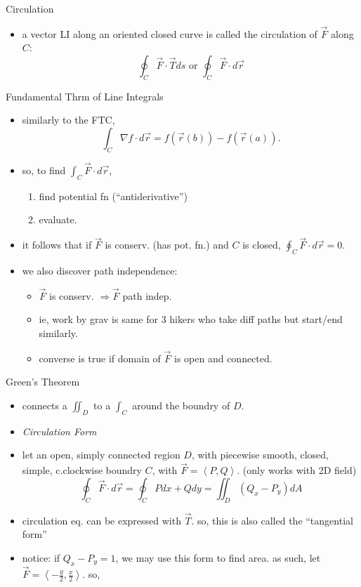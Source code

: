 \documentclass[11pt]{article}
\theoremstyle{definition}
\newcommand{\col}[1]{\begin{minipage}{\columnwidth}#1\end{minipage}}
\begin{document}
\newpage
\begin{multicols}{2}
  \col{
    Circulation
    \begin{itemize}
      \item a vector LI along an oriented closed curve is called the circulation of $\vec{F}$ along $C$:
      \[\oint_C \vec{F}\cdot\vec{T} ds \text{ or } \oint_C \vec{F}\cdot d\vec{r}\]
    \end{itemize}
    Fundamental Thrm of Line Integrals
    \begin{itemize}
      \item similarly to the FTC,
      \[\int_C \nabla f \cdot d\vec{r} = f(\vec{r}(b))-f(\vec{r}(a)).\]
      \item so, to find $\int_C \vec{F}\cdot d\vec{r}$,
      \begin{enumerate}
        \item find potential fn (``antiderivative'')
        \item evaluate.
      \end{enumerate}
      \item it follows that if $\vec{F}$ is conserv. (has pot. fn.) and $C$ is closed, $\oint_C \vec{F}\cdot d\vec{r}= 0.$
      \item we also discover path independence: 
      \begin{itemize}
        \item $\vec{F}$ is conserv. $\Rightarrow \vec{F}$ path indep.
        \item ie, work by grav is same for 3 hikers who take diff paths but start/end similarly.
        \item converse is true if domain of $\vec{F}$ is open and connected.
      \end{itemize}
    \end{itemize}
  }
  \col{
    Green's Theorem
    \begin{itemize}
      \item connects a $\iint_D$ to a $\int_C$ around the boundry of $D$.
      \item[] \emph{Circulation Form}
      \item let an open, simply connected region $D$, with piecewise smooth, closed, simple, c.clockwise boundry $C$, with $\vec{F} = \left<P,Q\right>$. (only works with 2D field)
      \[\oint_C\vec{F}\cdot d\vec{r} = \oint_C Pdx + Qdy = \iint_D(Q_x-P_y)dA\]
      \item circulation eq. can be expressed with $\vec{T}$. so, this is also called the ``tangential form''
      \item notice: if $Q_x-P_y=1$, we may use this form to find area. as such, let $\vec{F}=\left<-\frac{y}{2},\frac{x}{2}\right>$. so,

\end{itemize}}
\end{multicols}
\end{document}
